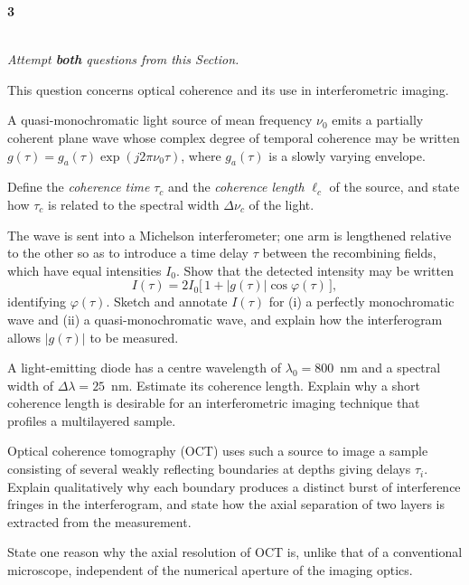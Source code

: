\documentclass[11pt]{article}
\newcommand{\qmarks}[1]{\hfill\makebox[0pt][r]{\hspace{1.5em}\textbf{[#1]}}}
\newcounter{question}
\newcommand{\question}{\par\vspace{4pt}\refstepcounter{question}%
  \noindent\makebox[1.6em][l]{\textbf{\thequestion}}}
\newcommand{\sectionbanner}[2]{%
  \vspace{6pt}\noindent{\large\textbf{#1}}\\[-2pt]
  \noindent\textit{#2}\par\vspace{4pt}}
\begin{document}
\newpage
\begin{center}\textbf{3}\end{center}

\sectionbanner{SECTION B}{Attempt \textbf{both} questions from this Section.}

\question
This question concerns optical coherence and its use in interferometric
imaging.

A quasi-monochromatic light source of mean frequency $\nu_0$ emits a partially
coherent plane wave whose complex degree of temporal coherence may be written
$g(\tau) = g_a(\tau)\exp(j2\pi\nu_0\tau)$, where $g_a(\tau)$ is a slowly
varying envelope.

\begin{parts}

\item Define the \textit{coherence time} $\tau_c$ and the \textit{coherence
length} $\ell_c$ of the source, and state how $\tau_c$ is related to the
spectral width $\Delta\nu_c$ of the light.
\qmarks{3}

\item The wave is sent into a Michelson interferometer; one arm is lengthened
relative to the other so as to introduce a time delay $\tau$ between the
recombining fields, which have equal intensities $I_0$. Show that the detected
intensity may be written
\[
  I(\tau) = 2I_0\bigl[\,1 + |g(\tau)|\cos\varphi(\tau)\,\bigr],
\]
identifying $\varphi(\tau)$. Sketch and annotate $I(\tau)$ for (i) a perfectly
monochromatic wave and (ii) a quasi-monochromatic wave, and explain how the
interferogram allows $|g(\tau)|$ to be measured.
\qmarks{5}

\item A light-emitting diode has a centre wavelength of $\lambda_0 = 800$~nm
and a spectral width of $\Delta\lambda = 25$~nm. Estimate its coherence length.
Explain why a short coherence length is desirable for an interferometric
imaging technique that profiles a multilayered sample.
\qmarks{4}

\item Optical coherence tomography (OCT) uses such a source to image a sample
consisting of several weakly reflecting boundaries at depths giving delays
$\tau_i$. Explain qualitatively why each boundary produces a distinct burst of
interference fringes in the interferogram, and state how the axial separation
of two layers is extracted from the measurement.
\qmarks{4}

\item State one reason why the axial resolution of OCT is, unlike that of a
conventional microscope, independent of the numerical aperture of the imaging
optics.
\qmarks{4}

\end{parts}
\end{document}
